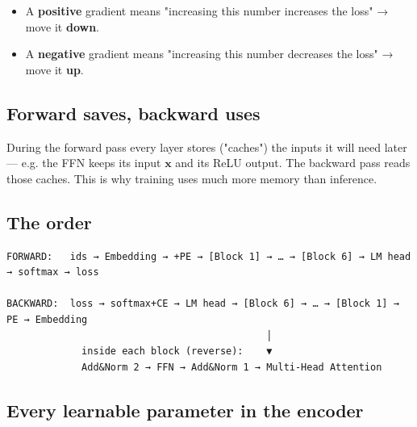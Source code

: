 \documentclass[11pt,a4paper,oneside]{report}
\providecommand{\tightlist}{\setlength{\itemsep}{0pt}\setlength{\parskip}{0pt}}
\begin{document}
\begin{itemize}
\tightlist
\item
  A \textbf{positive} gradient means "increasing this number increases the loss" → move it \textbf{down}.
\item
  A \textbf{negative} gradient means "increasing this number decreases the loss" → move it \textbf{up}.
\end{itemize}

\subsection{Forward saves, backward uses}\label{forward-saves-backward-uses}

During the forward pass every layer stores ("caches") the inputs it will need later --- e.g. the FFN keeps its input \(\mathbf{x}\) and its ReLU output. The backward pass reads those caches. This is why training uses much more memory than inference.

\subsection{The order}\label{the-order}

\begin{Verbatim}[fontsize=\small]
FORWARD:   ids → Embedding → +PE → [Block 1] → … → [Block 6] → LM head → softmax → loss

BACKWARD:  loss → softmax+CE → LM head → [Block 6] → … → [Block 1] → PE → Embedding
                                             │
             inside each block (reverse):    ▼
             Add&Norm 2 → FFN → Add&Norm 1 → Multi-Head Attention
\end{Verbatim}

\subsection{Every learnable parameter in the encoder}\label{every-learnable-parameter-in-the-encoder}
\end{document}

